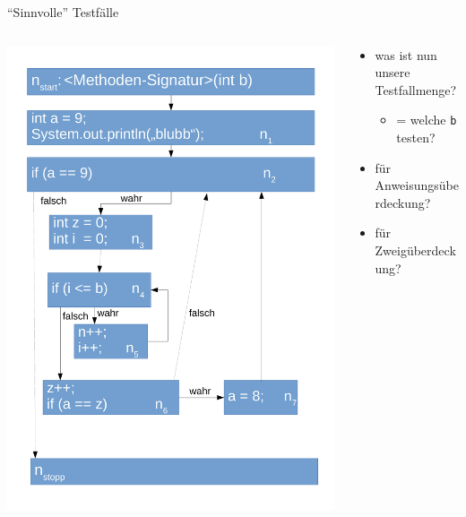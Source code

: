 \documentclass[18pt]{beamer}
\begin{document}
	\begin{frame}{\enquote{Sinnvolle} Testfälle}
		\begin{columns}
			\begin{column}{0.5\textwidth}
				\includegraphics[scale=0.27]{./pics/tut5/kfo-no-goto.pdf}
			\end{column}%
			\begin{column}{0.5\textwidth}
				\begin{itemize}
					\item was ist nun unsere Testfallmenge?			
					\begin{itemize}
						\item = welche \texttt{b} testen?
					\end{itemize}
						\item für Anweisungsüberdeckung?
						\item für Zweigüberdeckung?
				\end{itemize}
			\end{column}
		\end{columns}
	\end{frame}
\end{document}
